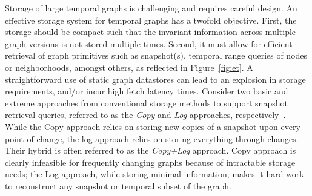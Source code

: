 \documentclass{svjour3}
\begin{document}
Storage of large temporal graphs is challenging and requires careful design. An effective storage system for temporal graphs has a twofold objective. First, the storage should be compact such that the invariant information across multiple graph versions is not stored multiple times. Second, it must allow for efficient retrieval of graph primitives such as snapshot(s), temporal range queries of nodes or neighborhoods, amongst others, as reflected in Figure~\ref{fig:et}. A straightforward use of static graph datastores can lead to an explosion in storage requirements, and/or incur high fetch latency times.  
Consider two basic and extreme approaches from conventional storage methods 
to support snapshot retrieval queries, referred to as the \textit{Copy} and \textit{Log} approaches, respectively~\cite{Salzberg1999}. While the Copy approach relies on storing new copies of a snapshot upon every point of change, the log approach relies on storing everything through changes. Their hybrid is often referred to as the \textit{Copy+Log} approach. Copy approach is clearly infeasible for frequently changing graphs because of intractable storage needs; the Log approach, while storing minimal information, makes it hard work to reconstruct any snapshot or temporal subset of the graph. %
\end{document}
